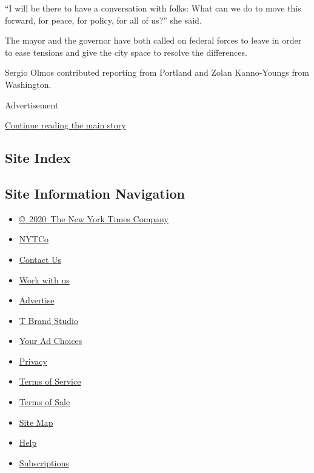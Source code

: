 ``I will be there to have a conversation with folks: What can we do to
move this forward, for peace, for policy, for all of us?'' she said.

The mayor and the governor have both called on federal forces to leave
in order to ease tensions and give the city space to resolve the
differences.

Sergio Olmos contributed reporting from Portland and Zolan Kanno-Youngs
from Washington.

Advertisement

\protect\hyperlink{after-bottom}{Continue reading the main story}

\hypertarget{site-index}{%
\subsection{Site Index}\label{site-index}}

\hypertarget{site-information-navigation}{%
\subsection{Site Information
Navigation}\label{site-information-navigation}}

\begin{itemize}
\tightlist
\item
  \href{https://help.nytimes3xbfgragh.onion/hc/en-us/articles/115014792127-Copyright-notice}{©~2020~The
  New York Times Company}
\end{itemize}

\begin{itemize}
\tightlist
\item
  \href{https://www.nytco.com/}{NYTCo}
\item
  \href{https://help.nytimes3xbfgragh.onion/hc/en-us/articles/115015385887-Contact-Us}{Contact
  Us}
\item
  \href{https://www.nytco.com/careers/}{Work with us}
\item
  \href{https://nytmediakit.com/}{Advertise}
\item
  \href{http://www.tbrandstudio.com/}{T Brand Studio}
\item
  \href{https://www.nytimes3xbfgragh.onion/privacy/cookie-policy\#how-do-i-manage-trackers}{Your
  Ad Choices}
\item
  \href{https://www.nytimes3xbfgragh.onion/privacy}{Privacy}
\item
  \href{https://help.nytimes3xbfgragh.onion/hc/en-us/articles/115014893428-Terms-of-service}{Terms
  of Service}
\item
  \href{https://help.nytimes3xbfgragh.onion/hc/en-us/articles/115014893968-Terms-of-sale}{Terms
  of Sale}
\item
  \href{https://spiderbites.nytimes3xbfgragh.onion}{Site Map}
\item
  \href{https://help.nytimes3xbfgragh.onion/hc/en-us}{Help}
\item
  \href{https://www.nytimes3xbfgragh.onion/subscription?campaignId=37WXW}{Subscriptions}
\end{itemize}
